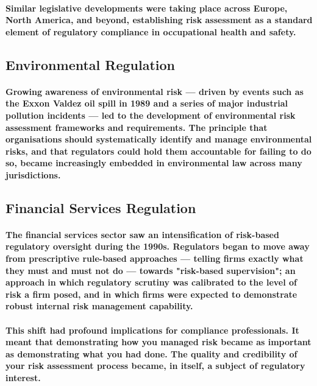 \paragraph{Similar legislative developments were taking place across Europe, North America, and beyond, establishing risk assessment as a standard element of regulatory compliance in occupational health and safety.}

\subsection{Environmental Regulation}

\paragraph{Growing awareness of environmental risk — driven by events such as the Exxon Valdez oil spill in 1989 and a series of major industrial pollution incidents — led to the development of environmental risk assessment frameworks and requirements. The principle that organisations should systematically identify and manage environmental risks, and that regulators could hold them accountable for failing to do so, became increasingly embedded in environmental law across many jurisdictions.}

\subsection{Financial Services Regulation}

\paragraph{The financial services sector saw an intensification of risk-based regulatory oversight during the 1990s. Regulators began to move away from prescriptive rule-based approaches — telling firms exactly what they must and must not do — towards \textbf{"risk-based supervision"}; an approach in which regulatory scrutiny was calibrated to the level of risk a firm posed, and in which firms were expected to demonstrate robust internal risk management capability.}
\paragraph{This shift had profound implications for compliance professionals. It meant that demonstrating how you managed risk became as important as demonstrating what you had done. The quality and credibility of your risk assessment process became, in itself, a subject of regulatory interest.}

